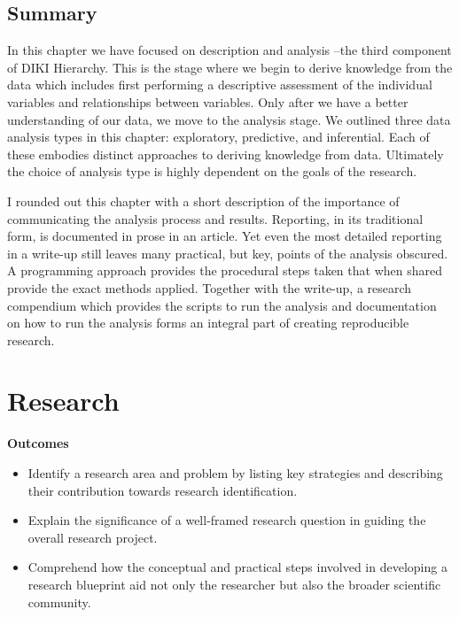 \documentclass[
  letterpaper,
]{book}
\providecommand{\tightlist}{%
  \setlength{\itemsep}{0pt}\setlength{\parskip}{0pt}}\usepackage{longtable,booktabs,array}
\theoremstyle{definition}
\theoremstyle{remark}
\begin{document}
\section*{Summary}\label{summary-2}


In this chapter we have focused on description and analysis --the third
component of DIKI Hierarchy. This is the stage where we begin to derive
knowledge from the data which includes first performing a descriptive
assessment of the individual variables and relationships between
variables. Only after we have a better understanding of our data, we
move to the analysis stage. We outlined three data analysis types in
this chapter: exploratory, predictive, and inferential. Each of these
embodies distinct approaches to deriving knowledge from data. Ultimately
the choice of analysis type is highly dependent on the goals of the
research.

I rounded out this chapter with a short description of the importance of
communicating the analysis process and results. Reporting, in its
traditional form, is documented in prose in an article. Yet even the
most detailed reporting in a write-up still leaves many practical, but
key, points of the analysis obscured. A programming approach provides
the procedural steps taken that when shared provide the exact methods
applied. Together with the write-up, a research compendium which
provides the scripts to run the analysis and documentation on how to run
the analysis forms an integral part of creating reproducible research.

\chapter{Research}\label{sec-research-chapter}

\begin{tcolorbox}[enhanced jigsaw, breakable, colframe=quarto-callout-color-frame, toprule=.15mm, arc=.35mm, colback=white, left=2mm, bottomrule=.15mm, rightrule=.15mm, opacityback=0, leftrule=.75mm]

\textbf{ Outcomes}

\begin{itemize}
\tightlist
\item
  Identify a research area and problem by listing key strategies and
  describing their contribution towards research identification.
\item
  Explain the significance of a well-framed research question in guiding
  the overall research project.
\item
  Comprehend how the conceptual and practical steps involved in
  developing a research blueprint aid not only the researcher but also
  the broader scientific community.
\end{itemize}

\end{tcolorbox}
\end{document}
